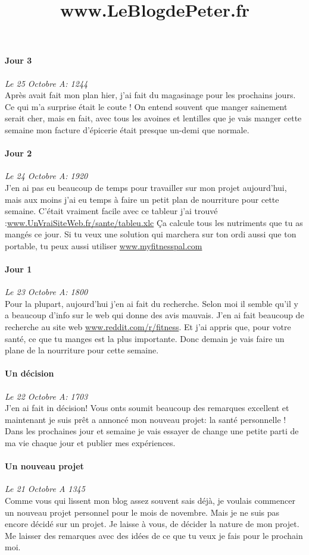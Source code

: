 \documentclass{article}
\begin{document}
\title{www.LeBlogdePeter.fr}


\paragraph{Jour 3} \emph{Le 25 Octobre A: 1244}\\
Après avait fait mon plan hier, j'ai fait du magasinage pour les prochains jours. Ce qui m'a surprise était le coute ! On entend souvent que manger sainement serait cher, mais en fait, avec tous les avoines et lentilles que je vais manger cette semaine mon facture d'épicerie était presque un-demi que normale.

\paragraph{Jour 2} \emph{Le 24 Octobre A: 1920}\\
J'en ai pas eu beaucoup de temps pour travailler sur mon projet aujourd'hui, mais aux moins j'ai eu temps à faire un petit plan de nourriture
pour cette semaine. C'était vraiment facile avec ce tableur j'ai trouvé :\underline{www.UnVraiSiteWeb.fr/sante/tableu.xlc}  Ça calcule tous les nutriments que tu as mangés ce jour. Si tu veux une solution qui marchera sur ton ordi aussi que ton portable, tu peux aussi utiliser \underline{www.myfitnesspal.com}

\paragraph{Jour 1} \emph{Le 23 Octobre A: 1800}\\
Pour la plupart, aujourd'hui j'en ai fait du recherche. Selon moi il semble qu'il y a beaucoup d'info sur le web qui donne des avis mauvais. J'en ai fait beaucoup de recherche au site web \underline{www.reddit.com/r/fitness}. Et j'ai appris que, pour votre santé, ce que tu manges est la plus importante. Donc demain je vais faire un plane de la nourriture pour cette semaine.

\paragraph{Un décision} \emph{Le 22 Octobre A: 1703}\\
J'en ai fait in décision! Vous onts soumit beaucoup des remarques excellent et maintenant je suis prêt a annoncé mon nouveau projet: la santé personnelle ! Dans les prochaines jour et semaine je vais essayer de change une petite parti de ma vie chaque jour et publier mes expériences.

\paragraph{Un nouveau projet} \emph{Le 21 Octobre A 1345} \\
Comme vous qui lissent mon blog assez souvent sais déjà, je voulais commencer un nouveau projet personnel pour le mois de novembre. Mais je ne suis pas encore décidé sur un projet. Je laisse à vous, de décider la nature de mon projet. Me laisser des remarques avec des idées de ce que tu veux je fais pour le prochain moi.
\end{document}
